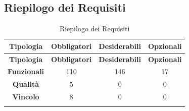 \subsection{Riepilogo dei Requisiti}
\renewcommand{\arraystretch}{1.2}
\begin{longtable}{| c | c | c | c |}
	\hline
	\rowcolor[gray]{0.9}
	\textbf{Tipologia} & \textbf{Obbligatori} & \textbf{Desiderabili} & \textbf{Opzionali} \\
	\hline
	\endfirsthead
	
	\hline
	\rowcolor[gray]{0.9}
	\textbf{Tipologia} & \textbf{Obbligatori} & \textbf{Desiderabili} & \textbf{Opzionali} \\
	\hline
	\endhead
	
	\hline
	\textbf{Funzionali} & 110 & 146 & 17 \\
	\hline
	\textbf{Qualità} & 5 & 0 & 0 \\
	\hline
	\textbf{Vincolo} & 8 & 0 & 0 \\
	\hline
	
	\caption{Riepilogo dei Requisiti}
	\label{tab:riepilogo}
	
\end{longtable}